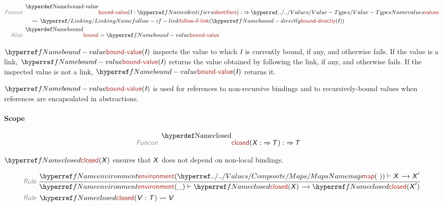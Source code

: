 \documentclass[fleqn]{article}
\begin{document}
\begin{align*}
  \KEY{Funcon} ~ 
  & \NAME[\DECL]{bound-value}(\VAR{I} : \NAME[\REF]{identifiers}) :  \TO \NAME[\HYPER{../../Values}{Value-Types}]{values} \\
  & \quad \leadsto {}
          \begin{aligned}[t]
          & \NAME[\HYPER{}{Linking}]{follow-if-link}
              (\NAME[\REF]{bound-directly}
                 (\VAR{I}))
          \end{aligned}
\\
  \KEY{Alias} ~ 
  & \NAME[\DECL]{bound} = \NAME[\REF]{bound-value}
\end{align*}

 
   $\NAME[\REF]{bound-value}
   (\VAR{I})$ inspects the value to which ${\textsf{\textsl{I}}}$ is currently bound, if any,
   and otherwise fails. If the value is a link, $\NAME[\REF]{bound-value}
   (\VAR{I})$ returns the
   value obtained by following the link, if any, and otherwise fails. If the 
   inspected value is not a link, $\NAME[\REF]{bound-value}
   (\VAR{I})$ returns it. 
   
   $\NAME[\REF]{bound-value}
   (\VAR{I})$ is used for references to non-recursive bindings and to
   recursively-bound values when references are encapsulated in abstractions.


\paragraph*{Scope}


\begin{align*}
  \KEY{Funcon} ~ 
  & \NAME[\DECL]{closed}(\VAR{X} :  \TO \VAR{T}) :  \TO \VAR{T}
\end{align*}


  $\NAME[\REF]{closed}
   (\VAR{X})$ ensures that ${\textsf{\textsl{X}}}$ does not depend on non-local bindings.


\begin{align*}
  \KEY{Rule} ~ 
    & \RULE{
      \NAME[\REF]{environment} (\NAME[\HYPER{../../Values/Composite}{Maps}]{map}
                              ( ~ )) \vdash \VAR{X} \TRANS \VAR{X}'
      }{
      \NAME[\REF]{environment} (\_) \vdash \NAME[\REF]{closed}
                    (\VAR{X}) \TRANS \NAME[\REF]{closed}
                                                               (\VAR{X}')
      }
\\
  \KEY{Rule} ~ 
    & \NAME[\REF]{closed}
        (\VAR{V} : \VAR{T}) \leadsto \VAR{V}
\end{align*}
\end{document}
